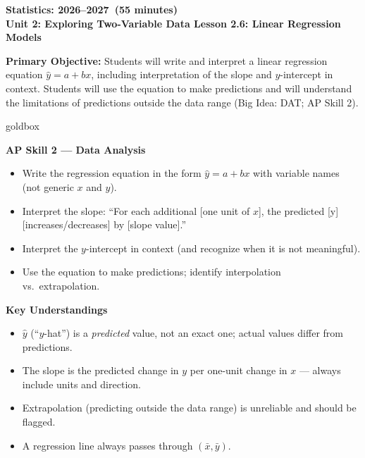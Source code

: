 \documentclass[10pt]{article}
\newcommand{\CourseName}{Statistics}
\newcommand{\SchoolYear}{2026--2027}
\newcommand{\MeetingLength}{55 minutes}
\newcommand{\UnitNumberName}{Unit 2: Exploring Two-Variable Data \quad}
\newcommand{\LessonNumberName}{Lesson 2.6: Linear Regression Models}
\begin{document}
\begin{center}
    {\Large\bfseries \CourseName: \SchoolYear\ (\MeetingLength) \\
    {\small\bfseries \UnitNumberName \LessonNumberName}}
\end{center}

\begin{tcolorbox}[colback=sky,colframe=navy,boxrule=0.9pt,arc=2mm,
    left=2mm,right=2mm,top=1.5mm,bottom=1.5mm]
    \textbf{Primary Objective:} Students will write and interpret a linear regression equation
    $\hat{y} = a + bx$, including interpretation of the slope and $y$-intercept in context.
    Students will use the equation to make predictions and will understand the limitations of
    predictions outside the data range (Big Idea: DAT; AP Skill 2).
\end{tcolorbox}

\begin{skillbox}{goldbox}
\begin{minipage}[t]{0.48\linewidth}
    \textbf{AP Skill 2 --- Data Analysis}
    \begin{itemize}
        \item Write the regression equation in the form $\hat{y} = a + bx$ with variable names (not generic $x$ and $y$).
        \item Interpret the slope: ``For each additional [one unit of $x$], the predicted [y] [increases/decreases] by [slope value].''
        \item Interpret the $y$-intercept in context (and recognize when it is not meaningful).
        \item Use the equation to make predictions; identify interpolation vs.\ extrapolation.
    \end{itemize}
\end{minipage}
\hfill
\begin{minipage}[t]{0.48\linewidth}
    \textbf{Key Understandings}
    \begin{itemize}
        \item $\hat{y}$ (``$y$-hat'') is a \textit{predicted} value, not an exact one; actual values differ from predictions.
        \item The slope is the predicted change in $y$ per one-unit change in $x$ --- always include units and direction.
        \item Extrapolation (predicting outside the data range) is unreliable and should be flagged.
        \item A regression line always passes through $(\bar{x}, \bar{y})$.
    \end{itemize}
\end{minipage}
\end{skillbox}
\end{document}
